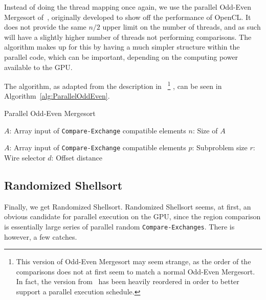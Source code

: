 Instead of doing the thread mapping once again, we use the parallel Odd-Even Mergesort of~, originally developed to show off the performance of OpenCL. It does not provide the same $n/2$ upper limit on the number of threads, and as such will have a slightly higher number of threads not performing comparisons. The algorithm makes up for this by having a much simpler structure within the parallel code, which can be important, depending on the computing power available to the GPU.

The algorithm, as adapted from the description in~
\footnote{
This version of Odd-Even Mergesort may seem strange, as the order of the comparisons does not at first seem to match a normal Odd-Even Mergesort. In fact, the version from~ has been heavily reordered in order to better support a parallel execution schedule.
}
, can be seen in Algorithm~\ref{alg:ParallelOddEven}.

\begin{algorithm}
\caption{Parallel Odd-Even Mergesort}\label{alg:ParallelOddEven}
\begin{algorithmic}[1]
	\Statex $A$: Array input of \texttt{Compare-Exchange} compatible elements
	\Statex $n$: Size of $A$
	\EndFor
\EndFor
\EndProcedure

\item[]

	\Statex $A$: Array input of \texttt{Compare-Exchange} compatible elements
	\Statex $p$: Subproblem size
	\Statex $r$: Wire selector
	\Statex $d$: Offset distance
\EndIf
\EndProcedure
\end{algorithmic}
\end{algorithm}

\subsection{Randomized Shellsort}

Finally, we get Randomized Shellsort. Randomized Shellsort seems, at first, an obvious candidate for parallel execution on the GPU, since the region comparison is essentially large series of parallel random \texttt{Compare-Exchanges}. There is however, a few catches.

